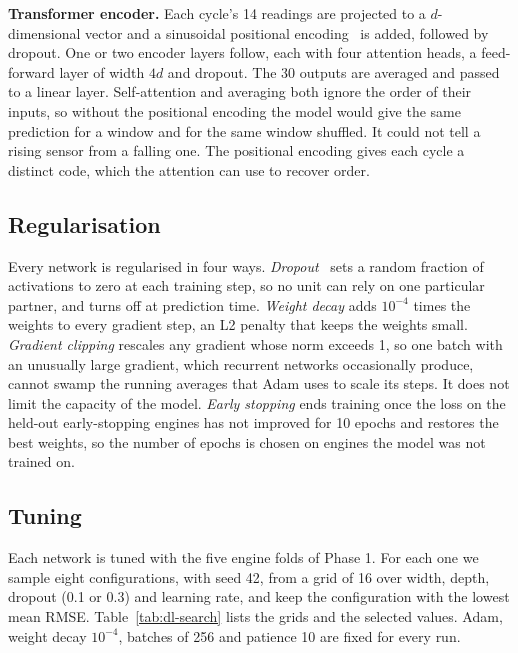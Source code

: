 \textbf{Transformer encoder.} Each cycle's 14 readings are projected to a
$d$-dimensional vector and a sinusoidal positional
encoding~\cite{vaswani2017attention} is added, followed by dropout. One or
two encoder layers follow, each with four attention heads, a feed-forward layer of width $4d$
and dropout. The 30 outputs are averaged and passed to a linear layer.
Self-attention and averaging both ignore the order of their inputs, so
without the positional encoding the model would give the same prediction for
a window and for the same window shuffled. It could not tell a rising
sensor from a falling one. The positional encoding gives each cycle a
distinct code, which the attention can use to recover order.

\subsection{Regularisation}
Every network is regularised in four ways. \emph{Dropout}~\cite{srivastava2014dropout}
sets a random fraction of activations to zero at each training step, so no
unit can rely on one particular partner, and turns off at prediction time.
\emph{Weight decay} adds $10^{-4}$ times the weights to every gradient
step, an L2 penalty that keeps the weights small. \emph{Gradient clipping}
rescales any gradient whose norm exceeds 1, so one batch with an unusually
large gradient, which recurrent networks occasionally produce, cannot swamp
the running averages that Adam uses to scale its steps. It does not limit
the capacity of the model.
\emph{Early stopping} ends training once the loss on the held-out
early-stopping engines has not improved for 10 epochs and restores the best
weights, so the number of epochs is chosen on engines the model was not
trained on.

\subsection{Tuning}
Each network is tuned with the five engine folds of Phase 1. For each one we
sample eight configurations, with seed 42, from a grid of 16 over width,
depth, dropout (0.1 or 0.3) and learning rate, and keep the configuration
with the lowest mean RMSE. Table~\ref{tab:dl-search} lists the grids and
the selected values. Adam, weight decay $10^{-4}$, batches of 256 and
patience 10 are fixed for every run.

